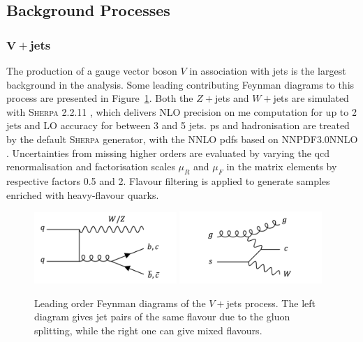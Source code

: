 \subsection{Background Processes}
\subsubsection{$\boldsymbol{V+}$jets}
The production of a gauge vector boson $V$ in association with jets is the largest background in the analysis. Some leading contributing Feynman diagrams to this process are presented in Figure~\ref{fig:feynVJ}. Both the $Z+$jets and $W+$jets are simulated with \textsc{Sherpa} 2.2.11 \cite{10.21468/SciPostPhys.7.3.034}, which delivers NLO precision on \gls{me} computation for up to 2 jets and LO accuracy for between 3 and 5 jets. \gls{ps} and hadronisation are treated by the default \textsc{Sherpa} generator, with the NNLO \glspl{pdf} based on NNPDF3.0NNLO \cite{PDFLHCrun2}. Uncertainties from missing higher orders are evaluated by varying the \gls{qcd} renormalisation and factorisation scales $\mu_R$ and $\mu_F$ in the matrix elements by respective factors 0.5 and 2. Flavour filtering is applied to generate samples enriched with heavy-flavour quarks.

\begin{figure}[h!]
  \center
  \includegraphics[width=0.48\textwidth]{Images/VH/Feynman/vjet.png}
  \includegraphics[width=0.48\textwidth]{Images/VH/Feynman/vjet2.png}
  \caption{Leading order Feynman diagrams of the $V+$jets process. The left diagram gives jet pairs of the same flavour due to the gluon splitting, while the right one can give mixed flavours.} 
  \label{fig:feynVJ}
\end{figure}

